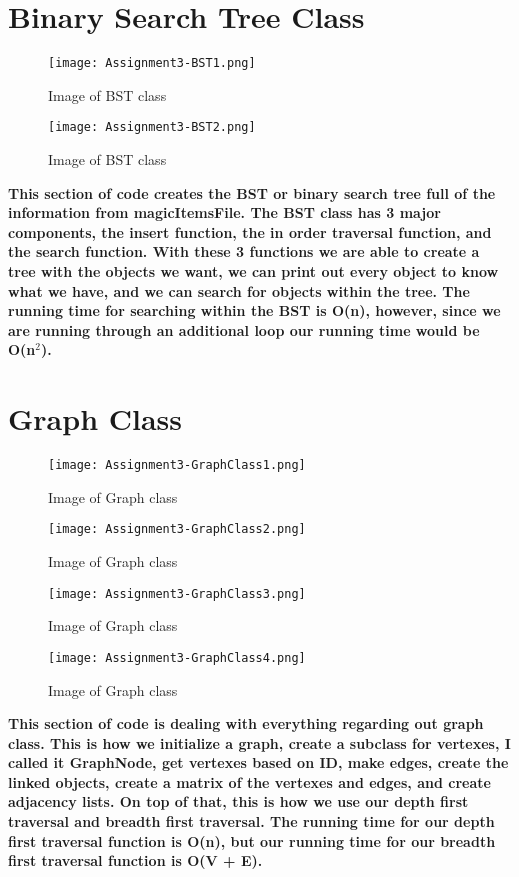\documentclass{article}
\begin{document}
\section{Binary Search Tree Class}
\begin{figure}[h]
    \centering
    \texttt{[image: Assignment3-BST1.png]}
    \caption{Image of BST class}
    \label{fig:BST}
\end{figure}
\begin{figure}[h]
    \centering
    \texttt{[image: Assignment3-BST2.png]}
    \caption{Image of BST class}
    \label{fig:BST}
\end{figure}
\newpage
\textbf{This section of code creates the BST or binary search tree full of the information from magicItemsFile. The BST class has 3 major components, the insert function, the in order traversal function, and the search function. With these 3 functions we are able to create a tree with the objects we want, we can print out every object to know what we have, and we can search for objects within the tree. The running time for searching within the BST is O(n), however, since we are running through an additional loop our running time would be O(n$^2$).}
\newpage

\section{Graph Class}
\begin{figure}[h]
    \centering
    \texttt{[image: Assignment3-GraphClass1.png]}
    \caption{Image of Graph class}
    \label{fig:Graph}
\end{figure}
\begin{figure}[h]
    \centering
    \texttt{[image: Assignment3-GraphClass2.png]}
    \caption{Image of Graph class}
    \label{fig:Graph}
\end{figure}
\begin{figure}[h]
    \centering
    \texttt{[image: Assignment3-GraphClass3.png]}
    \caption{Image of Graph class}
    \label{fig:Graph}
\end{figure}
\begin{figure}[h]
    \centering
    \texttt{[image: Assignment3-GraphClass4.png]}
    \caption{Image of Graph class}
    \label{fig:Graph}
\end{figure}
\newpage
\textbf{This section of code is dealing with everything regarding out graph class. This is how we initialize a graph, create a subclass for vertexes, I called it GraphNode, get vertexes based on ID, make edges, create the linked objects, create a matrix of the vertexes and edges, and create adjacency lists. On top of that, this is how we use our depth first traversal and breadth first traversal. The running time for our depth first traversal function is O(n), but our running time for our breadth first traversal function is O(V + E).}
\newpage
\end{document}
